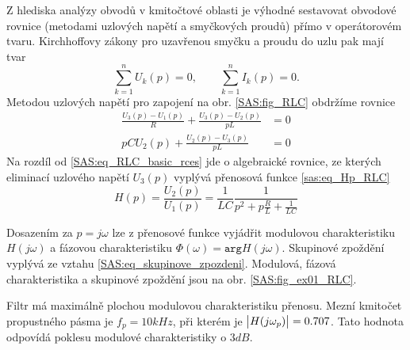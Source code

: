 \begin{example}
  Z hlediska analýzy obvodů v kmitočtové oblasti je výhodné sestavovat obvodové rovnice (metodami
  uzlových napětí a smyčkových proudů) přímo v operátorovém tvaru. Kirchhoffovy zákony pro
  uzavřenou smyčku a proudu do uzlu pak mají tvar $$\sum_{k=1}^{n}U_k(p) = 0, \qquad
  \sum_{k=1}^{n}I_k(p) = 0.$$ Metodou uzlových napětí pro zapojení na obr. \ref{SAS:fig_RLC}
  obdržíme rovnice
  \begin{align}
    \frac{U_3(p)-U_1(p)}{R}+\frac{U_3(p)-U_2(p)}{pL} &=  0 \\
    pCU_2(p) + \frac{U_2(p)-U_3(p)}{pL}              &=  0 
  \end{align}
  Na rozdíl od \ref{SAS:eq_RLC_basic_rces} jde o algebraické rovnice, ze kterých eliminací
  uzlového napětí $U_3(p)$ vyplývá přenosová funkce \ref{sas:eq_Hp_RLC} $$H(p) =
  \frac{U_2(p)}{U_1(p)}=\frac{1}{LC}\frac{1}{p^2+p\frac{R}{L}+\frac{1}{LC}}$$
  
   {\centering
    \captionsetup{type=figure}
    \label{SAS:fig_ex01_RLC}
    \par}    
  
  Dosazením za $p=j\omega$ lze z přenosové funkce vyjádřit modulovou charakteristiku $H(j\omega)$ a
  fázovou charakteristiku $\Phi(\omega)= \texttt{arg} H(j\omega)$. Skupinové zpoždění vyplývá ze
  vztahu \ref{SAS:eq_skupinove_zpozdeni}. Modulová, fázová charakteristika a skupinové zpoždění jsou
  na obr. \ref{SAS:fig_ex01_RLC}.
  
  Filtr má maximálně plochou modulovou charakteristiku přenosu. Mezní kmitočet propustného pásma
  je $f_p = 10 kHz$, při kterém je $\left\lvert H(j\omega_p)\right\rvert= 0.707$. Tato hodnota odpovídá poklesu
  modulové charakteristiky o $3 dB$.
  
  
\end{example} 